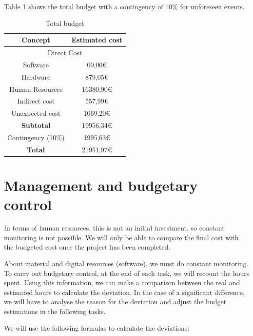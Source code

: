 \documentclass[titlepage,12pt]{report}
\begin{document}
Table \ref{total} shows the total budget with a contingency of 10\% for unforeseen events.

\begin{table}[H]
	\centering
	\begin{tabular}{|c|c|}
		\hline
		\textbf{Concept} 		& \textbf{Estimated cost} \\ \hline \hline
		\multicolumn{2}{|c|}{Direct Cost}  	\\ \hline
		Software 				&     00,00€  	\\
		Hardware				&    879,05€  	\\ 
		Human Resources 		&  16380,90€  	\\ \hline 
		Indirect cost			&    557,99€  	\\ \hline
		Unexpected cost			&   1069,20€	\\ \hline		
		\textbf{Subtotal}		&  19956,34€  	\\ \hline
		Contingency (10$\%$) 	&   1995,63€  	\\ \hline \hline
		\textbf{Total}			&  21951,97€  	\\ \hline
	\end{tabular}
	\caption{Total budget}
	\label{total}
\end{table}

\section{Management and budgetary control}

In terms of human resources, this is not an initial investment, so constant monitoring is not possible. We will only be able to compare the final cost with the budgeted cost once the project has been completed.

About material and digital resources (software), we must do constant monitoring. To carry out budgetary control, at the end of each task, we will recount the hours spent. Using this information, we can make a comparison between the real and estimated hours to calculate the deviation. In the case of a significant difference, we will have to analyse the reason for the deviation and adjust the budget estimations in the following tasks.

We will use the following formulas to calculate the deviations:
\end{document}

